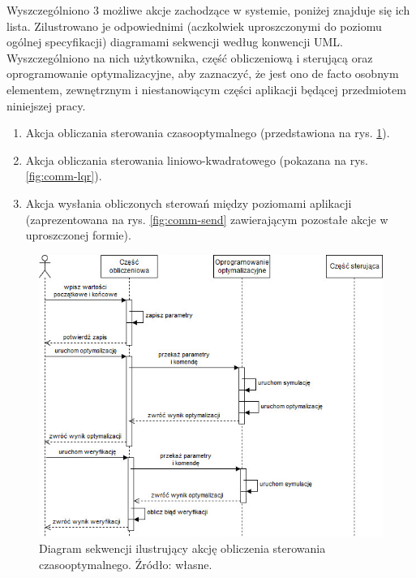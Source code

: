 Wyszczególniono 3 możliwe akcje zachodzące w systemie, poniżej znajduje się ich lista. Zilustrowano je odpowiednimi (aczkolwiek uproszczonymi do poziomu ogólnej specyfikacji) diagramami sekwencji według konwencji UML. Wyszczególniono na nich użytkownika, część obliczeniową i sterującą oraz oprogramowanie optymalizacyjne, aby zaznaczyć, że jest ono de facto osobnym elementem, zewnętrznym i niestanowiącym części aplikacji będącej przedmiotem niniejszej pracy.

\begin{enumerate}
    \item Akcja obliczania sterowania czasooptymalnego (przedstawiona na rys. \ref{fig:comm-toc}).
    \item Akcja obliczania sterowania liniowo-kwadratowego (pokazana na rys. \ref{fig:comm-lqr}).
    \item Akcja wysłania obliczonych sterowań między poziomami aplikacji (zaprezentowana na rys. \ref{fig:comm-send} zawierającym pozostałe akcje w uproszczonej formie).
\end{enumerate}

\begin{figure}[hpt]
    \centering
    \includegraphics[width=\textwidth]{Grafika/communication-toc}
    \caption{Diagram sekwencji ilustrujący akcję obliczenia sterowania czasooptymalnego. Źródło: własne.}\label{fig:comm-toc}
\end{figure}

